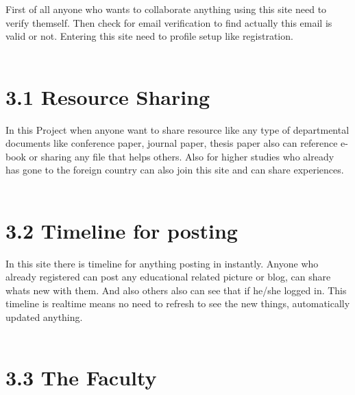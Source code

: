 \documentclass{standalone}
\begin{document}
First of all anyone who wants to collaborate anything using this site need to verify themself. Then check for email verification to find actually this email is valid or not. Entering this site need to profile setup like registration. \\\\

\section*{3.1\hspace{0.3 cm} Resource Sharing}

In this Project when anyone want to share resource like any type of departmental documents like conference paper, journal paper, thesis paper also can reference e-book or sharing any file that helps others. Also for higher studies who already has gone to the foreign country can also join this site and can share experiences.
\\\\

\section*{3.2\hspace{0.3 cm} Timeline for posting}

 \vspace{0.3cm}

In this site there is timeline for anything posting in instantly. Anyone who already registered can post any educational related picture or blog, can share whats new with them. And also others also can see that if he/she logged in. This timeline is realtime means no need to refresh to see the new things, automatically updated anything. \\ \\

\section*{3.3\hspace{0.3 cm} The Faculty}
 \vspace{0.3cm}
\end{document}
